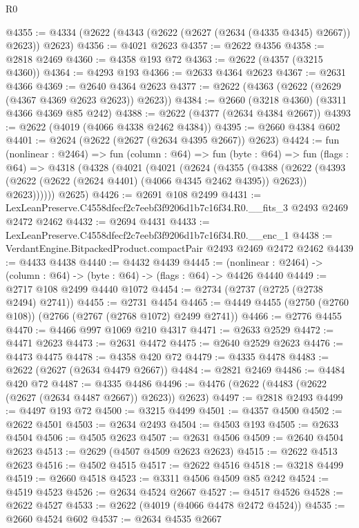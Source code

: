 \begin{lexlean}{R0}
\begin{coremodule}
@4355 := @4334 (@2622 (@4343 (@2622 (@2627 (@2634 (@4335 @4345) @2667)) @2623)) @2623)
@4356 := @4021 @2623
@4357 := @2622 @4356
@4358 := @2818 @2469
@4360 := @4358 @193 @72
@4363 := @2622 (@4357 (@3215 @4360))
@4364 := @4293 @193
@4366 := @2633 @4364 @2623
@4367 := @2631 @4366
@4369 := @2640 @4364 @2623
@4377 := @2622 (@4363 (@2622 (@2629 (@4367 @4369 @2623 @2623)) @2623))
@4384 := @2660 (@3218 @4360) (@3311 @4366 @4369 @85 @242)
@4388 := @2622 (@4377 (@2634 @4384 @2667))
@4393 := @2622 (@4019 (@4066 @4338 @2462 @4384))
@4395 := @2660 @4384 @602
@4401 := @2624 (@2622 (@2627 (@2634 @4395 @2667)) @2623)
@4424 := fun (nonlinear : @2464) =>
  fun (column : @64) =>
  fun (byte : @64) =>
  fun (flags : @64) =>
  @4318
    (@4328
      (@4021
        (@4021
          (@2624
            (@4355
              (@4388
                (@2622
                  (@4393 (@2622 (@2622 (@2624 @4401) (@4066 @4345 @2462 @4395)) @2623))
                  @2623))))))
      @2625)
@4426 := @2691 @108 @2499
@4431 := LexLeanPreserve.C4558dfecf2c7eebf3f9206d1b7c16f34.R0.__fits_3 @2493 @2469 @2472 @2462
@4432 := @2694 @4431
@4433 := LexLeanPreserve.C4558dfecf2c7eebf3f9206d1b7c16f34.R0.__enc_1
@4438 := VerdantEngine.BitpackedProduct.compactPair @2493 @2469 @2472 @2462
@4439 := @4433 @4438
@4440 := @4432 @4439
@4445 := (nonlinear : @2464) -> (column : @64) -> (byte : @64) -> (flags : @64) -> @4426 @4440
@4449 := @2717 @108 @2499 @4440 @1072
@4454 := @2734 (@2737 (@2725 (@2738 @2494) @2741))
@4455 := @2731 @4454
@4465 := @4449 @4455 (@2750 (@2760 @108)) (@2766 (@2767 (@2768 @1072) @2499 @2741))
@4466 := @2776 @4455
@4470 := @4466 @997 @1069 @210 @4317
@4471 := @2633 @2529
@4472 := @4471 @2623
@4473 := @2631 @4472
@4475 := @2640 @2529 @2623
@4476 := @4473 @4475
@4478 := @4358 @420 @72
@4479 := @4335 @4478
@4483 := @2622 (@2627 (@2634 @4479 @2667))
@4484 := @2821 @2469
@4486 := @4484 @420 @72
@4487 := @4335 @4486
@4496 := @4476 (@2622 (@4483 (@2622 (@2627 (@2634 @4487 @2667)) @2623)) @2623)
@4497 := @2818 @2493
@4499 := @4497 @193 @72
@4500 := @3215 @4499
@4501 := @4357 @4500
@4502 := @2622 @4501
@4503 := @2634 @2493
@4504 := @4503 @193
@4505 := @2633 @4504
@4506 := @4505 @2623
@4507 := @2631 @4506
@4509 := @2640 @4504 @2623
@4513 := @2629 (@4507 @4509 @2623 @2623)
@4515 := @2622 @4513 @2623
@4516 := @4502 @4515
@4517 := @2622 @4516
@4518 := @3218 @4499
@4519 := @2660 @4518
@4523 := @3311 @4506 @4509 @85 @242
@4524 := @4519 @4523
@4526 := @2634 @4524 @2667
@4527 := @4517 @4526
@4528 := @2622 @4527
@4533 := @2622 (@4019 (@4066 @4478 @2472 @4524))
@4535 := @2660 @4524 @602
@4537 := @2634 @4535 @2667

\end{coremodule}
\end{lexlean}
